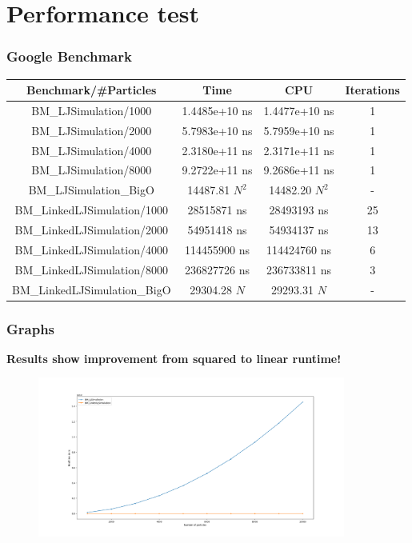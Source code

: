 
\section{Performance test}
\label{sec:perf}

\begin{frame}
    \frametitle{Google Benchmark}
    \begin{table}
        \centering
    \begin{tabular}{|c|c|c|c|}
        \toprule
        Benchmark/\#Particles & Time & CPU & Iterations \\
        \toprule
        BM\_LJSimulation/1000 & 1.4485e+10 ns & 1.4477e+10 ns & 1 \\
        \midrule
        BM\_LJSimulation/2000 & 5.7983e+10 ns & 5.7959e+10 ns & 1 \\
        \midrule
        BM\_LJSimulation/4000 & 2.3180e+11 ns & 2.3171e+11 ns & 1 \\
        \midrule
        BM\_LJSimulation/8000 & 9.2722e+11 ns & 9.2686e+11 ns & 1 \\
        \midrule
        BM\_LJSimulation\_BigO & 14487.81 $N^2$ & 14482.20 $N^2$ & - \\
        \midrule
        BM\_LinkedLJSimulation/1000 & 28515871 ns & 28493193 ns & 25 \\
        \midrule
        BM\_LinkedLJSimulation/2000 & 54951418 ns & 54934137 ns & 13 \\
        \midrule
        BM\_LinkedLJSimulation/4000 & 114455900 ns & 114424760 ns & 6 \\
        \midrule
        BM\_LinkedLJSimulation/8000 & 236827726 ns & 236733811 ns & 3 \\
        \midrule
        BM\_LinkedLJSimulation\_BigO & 29304.28 $N$ & 29293.31 $N$ & - \\
        \bottomrule
    \end{tabular}
    \end{table}
\end{frame}

\begin{frame}
    \frametitle{Graphs}
    \textbf{Results show improvement from squared to linear runtime!}
    \begin{figure}
        \label{fig:timelc}
        \includegraphics[width=0.9\textwidth]{res/lj_big_plot_linear}
    \end{figure}
\end{frame}

